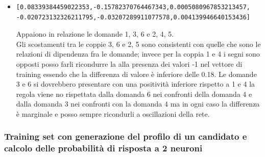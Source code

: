 \documentclass[10pt,a4paper]{article}
\begin{document}
\begin{itemize}
\item \begin{verbatim}[0.08339384459022353,-0.15782370764467343,0.0005080967853213457,
-0.020723132326211795,-0.03207289911077578,0.004139946640153436]
\end{verbatim}
Appaiono in relazione le domande 1, 3, 6 e 2, 4, 5.\\
Gli scostamenti tra le coppie 3, 6 e 2, 5 sono consistenti con quelle che sono le relazioni di dipendenza fra le domande; invece per la coppia 1 e 4 i segni sono opposti posso farli ricondurre la alla presenza dei valori -1 nel vettore di training essendo che la differenza di valore \`e inferiore delle 0.18.
Le domande 3 e 6 si dovrebbero presentare con una positivit\`a inferiore rispetto a 1 e 4 la regola viene no rispettata dalla domanda 6 nei confronti della domanda 4  e dalla domanda 3 nei confronti con la domanda 4 ma in ogni caso la differenza \`e marginale  e posso sempre ricondurli a oscillazioni della  rete.
\end{itemize}


\subsubsection{Training set con generazione del profilo di un candidato e calcolo delle probabilit\`a di risposta a  2 neuroni}
\label{Training set con generazione del profilo di un candidato e calcolo delle probabilita di risposta a  2 neuroni}
\end{document}
